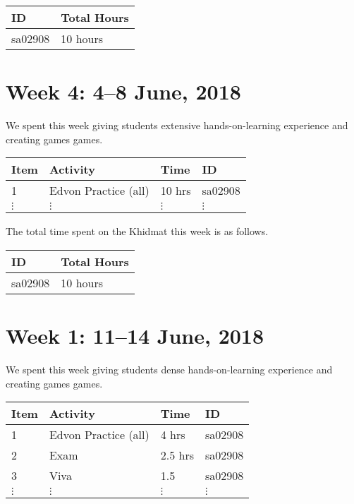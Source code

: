 \documentclass{article}
\begin{document}
\begin{tabular}{|l|l|}
  \hline
  ID & Total Hours\\\hline\hline
  sa02908 & 10 hours\\\hline
\end{tabular}


\newpage 
\section*{Week 4: 4--8 June, 2018}

We spent this week giving students extensive hands-on-learning experience and creating games games.

\begin{tabular}{|l|l|l|l|}
  \hline
  Item  & Activity & Time & ID \\\hline\hline
  1 & Edvon Practice (all) & 10 hrs & sa02908 \\\hline
  $\vdots$ & $\vdots$ & $\vdots$ & $\vdots$ \\\hline
\end{tabular}

The total time spent on the Khidmat this week is as follows.

\begin{tabular}{|l|l|}
  \hline
  ID & Total Hours\\\hline\hline
  sa02908 & 10 hours\\\hline
\end{tabular}


\newpage
\section*{Week 1: 11--14 June, 2018}

We spent this week giving students dense hands-on-learning experience and creating games games.

\begin{tabular}{|l|l|l|l|}
  \hline
  Item  & Activity & Time & ID \\\hline\hline
  1 & Edvon Practice (all) & 4 hrs & sa02908 \\\hline
  2 & Exam & 2.5 hrs & sa02908 \\\hline
  3 & Viva & 1.5 & sa02908 \\\hline
  $\vdots$ & $\vdots$ & $\vdots$ & $\vdots$ \\\hline
\end{tabular}
\end{document}
